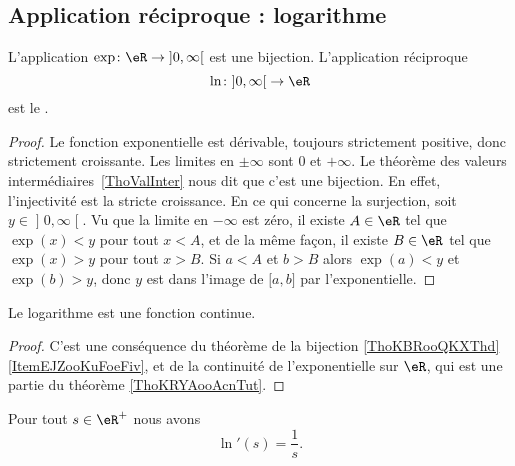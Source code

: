 \subsection{Application réciproque : logarithme}

\begin{propositionDef}    \label{DEFooELGOooGiZQjt}
	L'application \(\exp\colon \eR\to \mathopen] 0 , \infty \mathclose[\) est une bijection. L'application réciproque
	\begin{equation}
		\ln\colon \mathopen] 0 , \infty \mathclose[\to \eR
	\end{equation}
	est le .
\end{propositionDef}

\begin{proof}
	Le fonction exponentielle est dérivable, toujours strictement positive, donc strictement croissante. Les limites en \( \pm \infty\) sont \( 0\) et \( +\infty\). Le théorème des valeurs intermédiaires~\ref{ThoValInter} nous dit que c'est une bijection. En effet, l'injectivité est la stricte croissance. En ce qui concerne la surjection, soit \( y\in \mathopen] 0 , \infty \mathclose[\). Vu que la limite en \( -\infty\) est zéro, il existe \( A\in \eR\) tel que \( \exp(x)<y\) pour tout \( x<A\), et de la même façon, il existe \( B\in \eR\) tel que \( \exp(x)>y\) pour tout \( x>B\). Si \( a<A\) et \( b>B\) alors \( \exp(a)<y\) et \( \exp(b)>y\), donc \( y\) est dans l'image de \( \mathopen[ a , b \mathclose]\) par l'exponentielle.
\end{proof}

\begin{lemma}        \label{LEMooCYGTooEjXEUu}
	Le logarithme est une fonction continue.
\end{lemma}

\begin{proof}
	C'est une conséquence du théorème de la bijection \ref{ThoKBRooQKXThd}\ref{ItemEJZooKuFoeFiv}, et de la continuité de l'exponentielle sur \( \eR\), qui est une partie du théorème \ref{ThoKRYAooAcnTut}.
\end{proof}

\begin{proposition}      \label{PROPooPDJLooXphpEM}
	Pour tout \( s\in \eR^+\) nous avons
	\begin{equation}
		\ln'(s)=\frac{1}{ s }.
	\end{equation}
\end{proposition}

